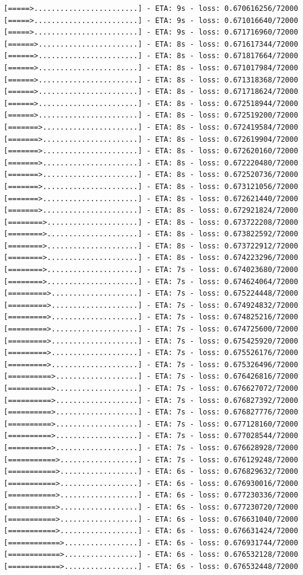 \documentclass[12pt,fleqn]{article}\usepackage{../../common}
\begin{document}
\begin{verbatim}
[=====>........................] - ETA: 9s - loss: 0.670616256/72000 [=====>........................] - ETA: 9s - loss: 0.671016640/72000 [=====>........................] - ETA: 9s - loss: 0.671716960/72000 [======>.......................] - ETA: 8s - loss: 0.671617344/72000 [======>.......................] - ETA: 8s - loss: 0.671817664/72000 [======>.......................] - ETA: 8s - loss: 0.671017984/72000 [======>.......................] - ETA: 8s - loss: 0.671318368/72000 [======>.......................] - ETA: 8s - loss: 0.671718624/72000 [======>.......................] - ETA: 8s - loss: 0.672518944/72000 [======>.......................] - ETA: 8s - loss: 0.672519200/72000 [=======>......................] - ETA: 8s - loss: 0.672419584/72000 [=======>......................] - ETA: 8s - loss: 0.672619904/72000 [=======>......................] - ETA: 8s - loss: 0.672620160/72000 [=======>......................] - ETA: 8s - loss: 0.672220480/72000 [=======>......................] - ETA: 8s - loss: 0.672520736/72000 [=======>......................] - ETA: 8s - loss: 0.673121056/72000 [=======>......................] - ETA: 8s - loss: 0.672621440/72000 [=======>......................] - ETA: 8s - loss: 0.672921824/72000 [========>.....................] - ETA: 8s - loss: 0.673722208/72000 [========>.....................] - ETA: 8s - loss: 0.673822592/72000 [========>.....................] - ETA: 8s - loss: 0.673722912/72000 [========>.....................] - ETA: 8s - loss: 0.674223296/72000 [========>.....................] - ETA: 7s - loss: 0.674023680/72000 [========>.....................] - ETA: 7s - loss: 0.674624064/72000 [=========>....................] - ETA: 7s - loss: 0.675224448/72000 [=========>....................] - ETA: 7s - loss: 0.674924832/72000 [=========>....................] - ETA: 7s - loss: 0.674825216/72000 [=========>....................] - ETA: 7s - loss: 0.674725600/72000 [=========>....................] - ETA: 7s - loss: 0.675425920/72000 [=========>....................] - ETA: 7s - loss: 0.675526176/72000 [=========>....................] - ETA: 7s - loss: 0.675326496/72000 [==========>...................] - ETA: 7s - loss: 0.676426816/72000 [==========>...................] - ETA: 7s - loss: 0.676627072/72000 [==========>...................] - ETA: 7s - loss: 0.676827392/72000 [==========>...................] - ETA: 7s - loss: 0.676827776/72000 [==========>...................] - ETA: 7s - loss: 0.677128160/72000 [==========>...................] - ETA: 7s - loss: 0.677028544/72000 [==========>...................] - ETA: 7s - loss: 0.676628928/72000 [===========>..................] - ETA: 7s - loss: 0.676129248/72000 [===========>..................] - ETA: 6s - loss: 0.676829632/72000 [===========>..................] - ETA: 6s - loss: 0.676930016/72000 [===========>..................] - ETA: 6s - loss: 0.677230336/72000 [===========>..................] - ETA: 6s - loss: 0.677230720/72000 [===========>..................] - ETA: 6s - loss: 0.676631040/72000 [===========>..................] - ETA: 6s - loss: 0.676631424/72000 [============>.................] - ETA: 6s - loss: 0.676931744/72000 [============>.................] - ETA: 6s - loss: 0.676532128/72000 [============>.................] - ETA: 6s - loss: 0.676532448/72000 
\end{verbatim}
\end{document}
